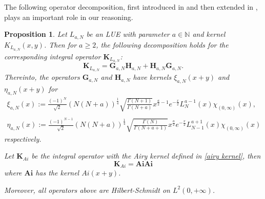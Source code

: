 \documentclass[11pt]{article}
\newtheorem{proposition}[theorem]{Proposition}
\numberwithin{equation}{section}%
\numberwithin{theorem}{section}
\begin{document}
The following operator decomposition, first introduced in \cite{tracy1994level} and then extended in \cite{johnstone2001distribution}, plays an important role in our reasoning.
\begin{proposition}\label{LUE fac}
    Let $L_{a,N}$ be an LUE with parameter $a\in\mathbb{N}$ and kernel $K_{L_{a,N}}(x,y)$. Then for $a\ge 2$, the following decomposition holds for the corresponding integral operator $\mathbf{K}_{L_{a,N}}$:
 \begin{equation}\label{LUE int2}
\mathbf{K}_{L_{a,N}}=\mathbf{G}_{a,N}\mathbf{H}_{a,N}+\mathbf{H}_{a,N}\mathbf{G}_{a,N}.
\end{equation}
Thereinto, the operators $\mathbf{G}_{a,N}$ and $\mathbf{H}_{a,N}$ have kernels $\xi_{a,N}(x+y)$ and $\eta_{a,N}(x+y)$ for
\begin{equation}\label{explicit xi and zeta}
    \begin{array}{ll}
   \xi_{a,N}(x):=\frac{(-1)^N}{\sqrt2}\left(N(N+a)\right)^\frac{1}{4}\sqrt{\frac{\Gamma(N+1)}{\Gamma(N+a)}}x^{\frac{a}{2}-1}e^{-\frac{x}{2}}L_{N}^{a-1}(x)\chi_{(0,\infty)}(x),\\
   \\
    \eta_{a,N}(x):=\frac{(-1)^{N-1}}{\sqrt2}\left(N(N+a)\right)^\frac{1}{4}\sqrt{\frac{\Gamma(N)}{\Gamma(N+a+1)}}x^{\frac{a}{2}}e^{-\frac{x}{2}}L_{N-1}^{a+1}(x)\chi_{(0,\infty)}(x)
    \end{array}
\end{equation}
respectively.

Let $\mathbf{K}_{Ai}$ be the integral operator with the Airy kernel defined in \eqref{airy kernel}, then
\begin{equation}\label{Afac}
    \mathbf{K}_{Ai}=\mathbf{Ai}\mathbf{Ai}
\end{equation}
where $\mathbf{Ai}$ has the kernel $Ai(x+y)$.

Moreover, all operators above are Hilbert-Schmidt on $L^2(0,+\infty)$.
\end{proposition}





 
\end{document}
